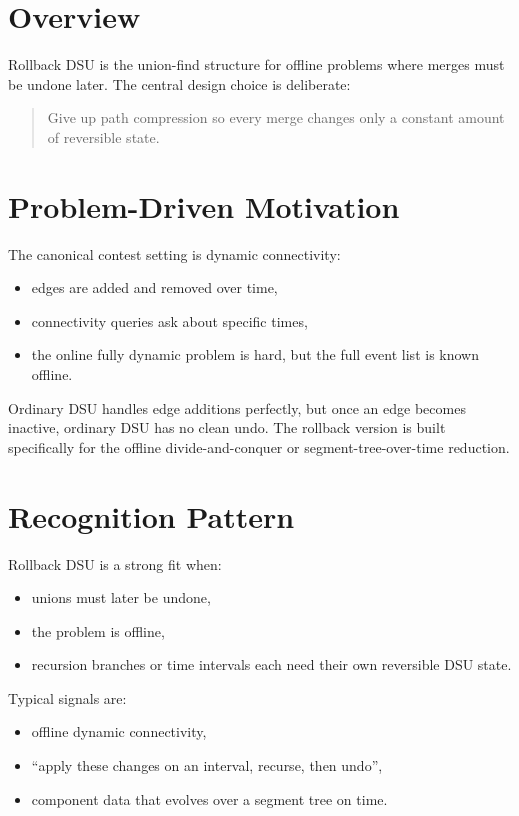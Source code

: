 \section*{Overview}

Rollback DSU is the union-find structure for offline problems where merges must be undone later. The central design
choice is deliberate:

\begin{quote}
Give up path compression so every merge changes only a constant amount of reversible state.
\end{quote}

\section*{Problem-Driven Motivation}

The canonical contest setting is dynamic connectivity:

\begin{itemize}
  \item edges are added and removed over time,
  \item connectivity queries ask about specific times,
  \item the online fully dynamic problem is hard, but the full event list is known offline.
\end{itemize}

Ordinary DSU handles edge additions perfectly, but once an edge becomes inactive, ordinary DSU has no clean undo. The
rollback version is built specifically for the offline divide-and-conquer or segment-tree-over-time reduction.

\section*{Recognition Pattern}

Rollback DSU is a strong fit when:

\begin{itemize}
  \item unions must later be undone,
  \item the problem is offline,
  \item recursion branches or time intervals each need their own reversible DSU state.
\end{itemize}

Typical signals are:

\begin{itemize}
  \item offline dynamic connectivity,
  \item ``apply these changes on an interval, recurse, then undo'',
  \item component data that evolves over a segment tree on time.
\end{itemize}

